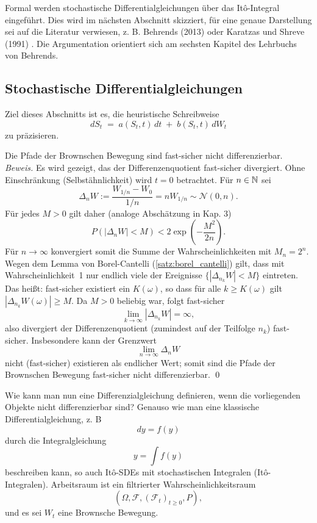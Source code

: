 Formal werden stochastische Differentialgleichungen über das It\^o-Integral eingeführt. Dies wird 
im nächsten Abschnitt skizziert, für eine genaue Darstellung sei auf die Literatur 
verwiesen, z. B. Behrends (2013) \cite{behrends} oder Karatzas und Shreve (1991) \cite{karatzas_brownian_1991}.
Die Argumentation orientiert sich am sechsten Kapitel des Lehrbuchs von Behrends.

\subsection{Stochastische Differentialgleichungen}

Ziel dieses Abschnitts ist es, die heuristische Schreibweise
$$
dS_t \;=\; a(S_t,t)\,dt \;+\; b(S_t,t)\,dW_t
$$
zu präzisieren.

\begin{lemma}
Die Pfade der Brownschen Bewegung sind fast-sicher nicht differenzierbar. \textit{Beweis.}
Es wird gezeigt, das der Differenzenquotient fast-sicher divergiert. Ohne Einschränkung (Selbstähnlichkeit) wird $t=0$ betrachtet. Für $n \in \Bbb N$ sei
$$\Delta_n W := \frac{W_{1/n} - W_0}{1/n}=n W_{1 / n} \sim \mathcal N(0, n).$$
Für jedes $M \gt 0$ gilt daher (analoge Abschätzung in Kap. 3)
$$P(\vert \Delta_n W \vert \lt M) \lt 2 \exp(- \frac{M^2}{2 n}).$$
Für $n \to \infty$ konvergiert somit die Summe der Wahrscheinlichkeiten mit $M_n = 2^n$.
Wegen dem Lemma von Borel-Cantelli (\ref{satz:borel_cantelli}) gilt, dass mit Wahrscheinlichkeit~1 nur endlich viele der Ereignisse $\{| \Delta_{n_k}W| < M\}$ eintreten. Das heißt: fast-sicher existiert ein $K(\omega)$, so dass für alle $k\ge K(\omega)$ gilt $|\Delta_{n_k}W(\omega)|\ge M$. Da $M>0$ beliebig war, folgt fast-sicher
$$
\lim_{k\to\infty} |\Delta_{n_k} W| = \infty,
$$
also divergiert der Differenzenquotient (zumindest auf der Teilfolge $n_k$) fast-sicher. Insbesondere kann der Grenzwert
$$
\lim_{n\to\infty} \Delta_n W
$$
nicht (fast-sicher) existieren als endlicher Wert; somit sind die Pfade der Brownschen Bewegung fast-sicher nicht differenzierbar. \qed
\end{lemma}

Wie kann man nun eine Differenzialgleichung definieren, wenn die vorliegenden Objekte nicht differenzierbar sind? Genauso wie man eine klassische Differentialgleichung, z. B
$$dy = f(y)$$
durch die Integralgleichung
$$y = \int f(y)$$
beschreiben kann, so auch It\^o-SDEs mit stochastischen Integralen (It\^o-Integralen).
Arbeitsraum ist ein filtrierter Wahrscheinlichkeitsraum
$$
(\Omega,\mathcal F,(\mathcal F_t)_{t\ge 0},P),
$$
und es sei $W_t$ eine Brownsche Bewegung. 

